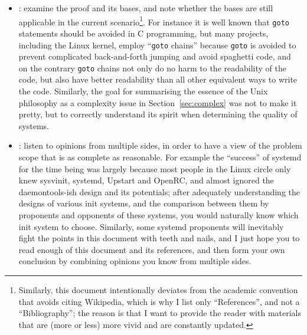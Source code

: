 \begin{itemize}
\item {}: examine the proof and its
	bases, and note whether the bases are still applicable in the current
	scenario\footnote{Similarly, this document intentionally deviates from the
	academic convention that avoids citing Wikipedia, which is why I list only
	``References'', and not a ``Bibliography''; the reason is that I want to
	provide the reader with materials that are (more or less) more vivid and
	are constantly updated.}.  For instance it is well known that \verb|goto|
	statements should be avoided in C programming, but many projects, including
	the Linux kernel, employ ``\verb|goto| chains''
	because \verb|goto| is avoided to prevent complicated back-and-forth jumping
	and avoid spaghetti code, and on the contrary \verb|goto| chains not only
	do no harm to the readability of the code, but also have better readability
	than all other equivalent ways to write the code.  Similarly, the goal for
	summarising the essence of the Unix philosophy as a complexity issue in
	Section~\ref{sec:complex} was not to make it pretty, but to correctly
	understand its spirit when determining the quality of systems.
\item {}: listen to opinions
	from multiple sides, in order to have a view of the problem scope that
	is as complete as reasonable.  For example the ``success'' of systemd
	for the time being was largely because most people in the Linux circle
	only knew sysvinit, systemd, Upstart and OpenRC, and almost ignored the
	daemontools-ish design and its potentials; after adequately understanding
	the designs of various init systems, and the comparison between them by
	proponents and opponents of these systems, you would naturally know which
	init system to choose.  Similarly, some systemd proponents will inevitably
	fight the points in this document with teeth and nails, and I just hope you
	to read enough of this document and its references, and then form your
	own conclusion by combining opinions you know from multiple sides.
\end{itemize}

